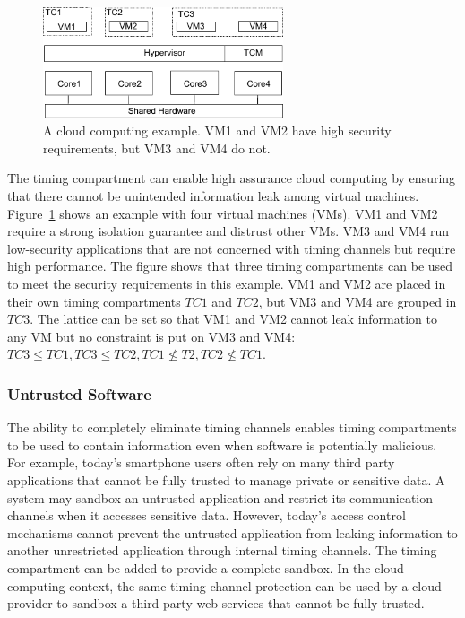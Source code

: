 \begin{figure}
    \begin{center}
        \includegraphics[width=2.79in]{figs/cloud_tcs.pdf}
        \caption{A cloud computing example. VM1 
        and VM2 have high security requirements, but VM3 and VM4 do not.}
        \label{fig:cloud_tcs}
    \end{center}
\end{figure}

The timing compartment can enable high assurance cloud computing by ensuring that
there cannot be unintended information leak among virtual machines.
Figure~\ref{fig:cloud_tcs} shows an example with four virtual machines (VMs).
VM1 and VM2 require a strong isolation guarantee and distrust other VMs.
VM3 and VM4 run low-security applications that are not concerned with timing channels
but require high performance. The figure shows that three timing compartments can
be used to meet the security requirements in this example.
VM1 and VM2 are placed in their own timing compartments $TC1$ and $TC2$, but 
VM3 and VM4 are grouped in $TC3$. The lattice can be set so that VM1 and VM2
cannot leak information to any VM but no constraint is put on VM3 and VM4:
$TC3 \leq TC1, TC3 \leq TC2, TC1 \nleq T2, TC2 \nleq TC1$.


\subsubsection{Untrusted Software} 

The ability to completely eliminate timing channels enables timing compartments
to be used to contain information even when software is potentially malicious.
For example, today's smartphone users often rely on many third party applications
that cannot be fully trusted to manage private or sensitive data. A system may
sandbox an untrusted application and restrict its communication channels
when it accesses sensitive data. However, today's access control mechanisms cannot
prevent the untrusted application from leaking information to another unrestricted
application through internal timing channels. The timing compartment can be added 
to provide a complete sandbox. 
In the cloud computing context, the same timing channel protection can be used
by a cloud provider to sandbox a third-party web services that cannot be fully trusted.

